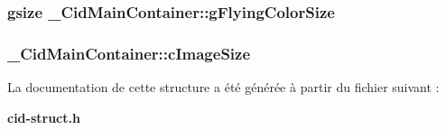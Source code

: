\subsubsection{\setlength{\rightskip}{0pt plus 5cm}gsize {\bf \_\-CidMainContainer::gFlyingColorSize}}\label{struct__CidMainContainer_b70c21d4252b5e98dcf3573d704dcba0}


\subsubsection{ {\bf \_\-CidMainContainer::cImageSize}}\label{struct__CidMainContainer_78792ea798e6e8d473539caf15ec47af}




La documentation de cette structure a été générée à partir du fichier suivant :\begin{CompactItemize}
\item 
{\bf cid-struct.h}\end{CompactItemize}
